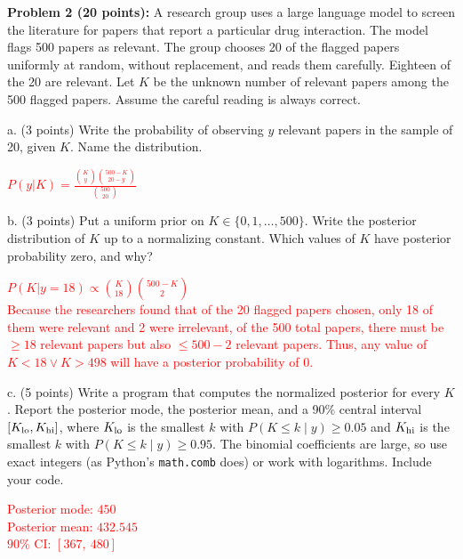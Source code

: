 \documentclass[11pt]{article}
\begin{document}
{\bf Problem 2 (20 points):} A research group uses a large language model to screen the literature for papers that report a particular drug interaction. The model flags 500 papers as relevant.  The group chooses 20 of the flagged papers uniformly at random, without replacement, and reads them carefully. Eighteen of the 20 are relevant.  Let $K$ be the unknown number of relevant papers among the 500 flagged papers.  Assume the careful reading is always correct.

a. (3 points) Write the probability of observing $y$ relevant papers in the sample of 20, given $K$.  Name the distribution.

\textcolor{red}{
$P(y | K) = \frac{\binom{K}{y} \binom{500 - K}{20 - y}}{\binom{500}{20}}$
}

b. (3 points) Put a uniform prior on $K\in\{0,1,\ldots,500\}$.  Write the posterior distribution of $K$ up to a normalizing constant.  Which values of $K$ have posterior probability zero, and why?

\textcolor{red}{
$P(K | y = 18) \propto \binom{K}{18} \binom{500 - K}{2}$\\
Because the researchers found that of the 20 flagged papers chosen, only 18 of them were relevant and 2 were irrelevant, of the 500 total papers, there must be $\ge 18$ relevant papers but also $\le 500-2$ relevant papers. Thus, any value of $K < 18 \lor K > 498$ will have a posterior probability of 0.
}

c. (5 points) Write a program that computes the normalized posterior for every $K$.  Report the posterior mode, the posterior mean, and a 90\% central interval $[K_{\rm lo},K_{\rm hi}]$, where $K_{\rm lo}$ is the smallest $k$ with $P(K\le k\mid y)\ge0.05$ and $K_{\rm hi}$ is the smallest $k$ with $P(K\le k\mid y)\ge0.95$.  The binomial coefficients are large, so use exact integers (as Python's {\tt math.comb} does) or work with logarithms.  Include your code.

\textcolor{red}{
Posterior mode: $450$\\
Posterior mean: $432.545$\\
$90\%$ CI: $[367,\ 480]$
}
\end{document}
